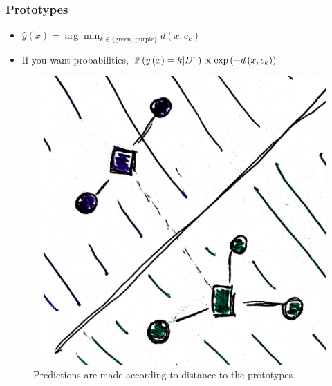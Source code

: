 \documentclass[10pt,mathserif]{beamer}
\begin{document}
\begin{frame}
  \frametitle{Prototypes}
 \begin{itemize}
 \item $\hat{y}\left(x\right) = \arg\min_{k \in \{\text{green, purple}\}} d\left(x, c_k\right)$
 \item If you want probabilities, $\mathbb{P}\left({y\left(x\right) = k \vert D^{n}}\right) \propto \operatorname{exp}\left(-d\left(x, c_k \right)\right)$
 \end{itemize} 
\begin{figure}[ht]
  \centering
  \includegraphics[width=0.7\paperwidth]{figure/prototypes_3}
  \caption{Predictions are made according to distance to the prototypes.\label{fig:prototypes_3} }
\end{figure}
\end{frame}
\end{document}
